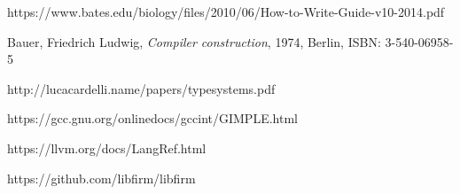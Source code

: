 \documentclass[leqno, 12pt]{article}
\begin{document}
		\newpage

	\begin{thebibliography}{9}
			https://www.bates.edu/biology/files/2010/06/How-to-Write-Guide-v10-2014.pdf
		
			Bauer, Friedrich Ludwig,
			\emph{Compiler construction},
			1974, Berlin,
			ISBN: 3-540-06958-5
		
			http://lucacardelli.name/papers/typesystems.pdf
	
			https://gcc.gnu.org/onlinedocs/gccint/GIMPLE.html

			https://llvm.org/docs/LangRef.html

			https://github.com/libfirm/libfirm
	\end{thebibliography}
	
	\newpage
	
    \tableofcontents
\end{document}
